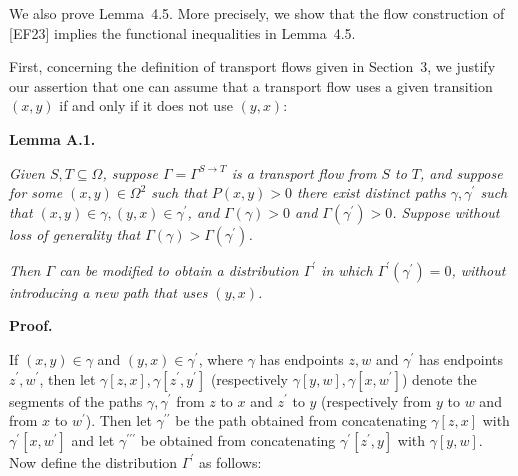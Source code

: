 We also prove Lemma 4.5. More precisely, we show that the flow construction of [EF23] implies the functional inequalities in Lemma 4.5.\par




First, concerning the definition of transport flows given in Section 3, we justify our assertion that one can assume that a transport flow uses a given transition $(x,y)$ if and only if it does not use $(y,x)$:\par





\par\medskip\noindent\textbf{\textbf{Lemma A.1}\textbf{.}}\par



\emph{Given $S,T\subseteq\Omega$, suppose $\Gamma=\Gamma^{S\rightarrow T}$ is a transport flow from $S$ to $T$, and suppose for some $(x,y)\in\Omega^{2}$ such that $P(x,y)>0$ there exist distinct paths $\gamma,\gamma^{\prime}$ such that $(x,y)\in\gamma,(y,x)\in\gamma^{\prime}$, and $\Gamma(\gamma)>0$ and $\Gamma(\gamma^{\prime})>0$. Suppose without loss of generality that $\Gamma(\gamma)>\Gamma(\gamma^{\prime})$.}\par




\emph{Then $\Gamma$ can be modified to obtain a distribution $\Gamma^{\prime}$ in which $\Gamma^{\prime}(\gamma^{\prime})=0$, without introducing a new path that uses $(y,x)$.}\par






\par\medskip\noindent\textbf{Proof.}\par



If $(x,y)\in\gamma$ and $(y,x)\in\gamma^{\prime}$, where $\gamma$ has endpoints $z,w$ and $\gamma^{\prime}$ has endpoints $z^{\prime},w^{\prime}$, then let $\gamma[z,x],\gamma[z^{\prime},y^{\prime}]$ (respectively $\gamma[y,w],\gamma[x,w^{\prime}]$) denote the segments of the paths $\gamma,\gamma^{\prime}$ from $z$ to $x$ and $z^{\prime}$ to $y$ (respectively from $y$ to $w$ and from $x$ to $w^{\prime}$). Then let $\gamma^{\prime\prime}$ be the path obtained from concatenating $\gamma[z,x]$ with $\gamma^{\prime}[x,w^{\prime}]$ and let $\gamma^{\prime\prime\prime}$ be obtained from concatenating $\gamma^{\prime}[z^{\prime},y]$ with $\gamma[y,w]$. Now define the distribution $\Gamma^{\prime}$ as follows:\par


